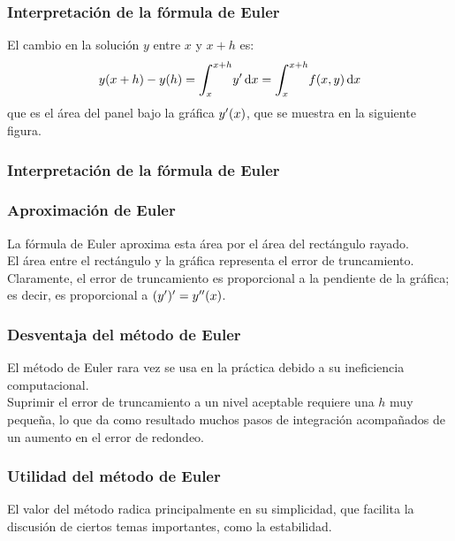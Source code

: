 \documentclass[12pt]{beamer}
\begin{document}
\begin{frame}
\frametitle{Interpretación de la fórmula de Euler}
El cambio en la solución $y$ entre $x$ y $x + h$ es:
\pause
\begin{align*}
y (x + h) - y (h) = \scaleint{6ex}_{\bs x}^{x+h} \pderivada{y} \dd{x} = \scaleint{6ex}_{\bs x}^{x+h} f (x, y) \dd{x}
\end{align*}
que es el área del panel bajo la gráfica ${y}^{\prime} (x)$, que se muestra en la siguiente figura.
\end{frame}
\begin{frame}[fragile]
\frametitle{Interpretación de la fórmula de Euler}
\begin{figure}
    \centering
\end{figure}
\end{frame}
\begin{frame}
\frametitle{Aproximación de Euler}
La fórmula de Euler aproxima esta área por el área del rectángulo rayado.
\\
\bigskip
\pause
El área entre el rectángulo y la gráfica representa el error de truncamiento. \pause Claramente, el error de truncamiento es proporcional a la pendiente de la gráfica; es decir, es proporcional a $({y}^{\prime})^{\prime} = {y}^{\prime \prime} (x)$.
\end{frame}
\begin{frame}
\frametitle{Desventaja del método de Euler}
El método de Euler rara vez se usa en la práctica debido a su ineficiencia computacional.
\\
\bigskip
\pause
Suprimir el error de truncamiento a un nivel aceptable requiere una $h$ muy pequeña, lo que da como resultado muchos pasos de integración acompañados de un aumento en el error de redondeo.
\end{frame}
\begin{frame}
\frametitle{Utilidad del método de Euler}
El valor del método radica principalmente en su simplicidad, que facilita la discusión de ciertos temas importantes, como la estabilidad.
\end{frame}
\end{document}
